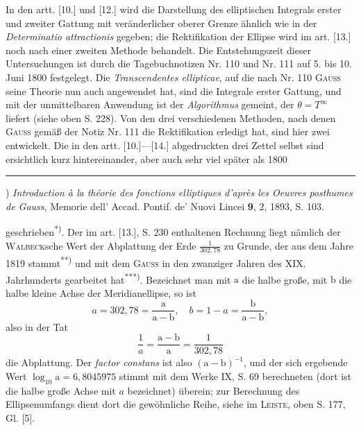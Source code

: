 \par\indent In den artt. [10.] und [12.] wird die Darstellung des elliptischen Integrals erster und zweiter Gattung mit veränderlicher oberer Grenze ähnlich wie in der \textit{Determinatio attractionis} gegeben; die Rektifikation der Ellipse wird im art. [13.] noch nach einer zweiten Methode behandelt. Die Entstehungszeit dieser Untersuchungen ist durch die Tagebuchnotizen Nr. 110 und Nr. 111 auf 5. bis 10. Juni 1800 festgelegt. Die \textit{Transcendentes ellipticae}, auf die nach Nr. 110 \textsc{Gauss} seine Theorie nun auch  angewendet hat, sind die Integrale erster Gattung, und mit der unmittelbaren Anwendung ist der \textit{Algorithmus} gemeint, der $\theta=T^\infty$ liefert (siehe oben S. 228). Von den drei verschiedenen Methoden, nach denen \textsc{Gauss} gemäß der Notiz Nr. 111 die Rektifikation erledigt hat, sind hier zwei entwickelt. Die in den artt. [10.]—[14.] abgedruckten drei Zettel selbst sind ersichtlich kurz hintereinander, aber auch sehr viel später als 1800
\par\smallskip\noindent\rule{.25\linewidth}{.4pt}\par
{\small
\par\indent *) \textit{Introduction à la théorie des fonctions elliptiques d'après les Oeuvres posthumes de Gauss}, Memorie dell’ Accad. Pontif. de’ Nuovi Lincei \textbf{9}, 2, 1893, S. 103.
\par}
\clearpage
\fancyhead{}
\noindent geschrieben\textsuperscript{*)}. Der im art. [13.], S. 230 enthaltenen Rechnung liegt nämlich der \textsc{Walbeck}sche Wert der Abplattung der Erde $\frac1{302{,}78}$ zu Grunde, der aus dem Jahre 1819 stammt\textsuperscript{**)} und mit dem \textsc{Gauss} in den zwanziger Jahren des XIX. Jahrhunderts gearbeitet hat\textsuperscript{***)}. Bezeichnet man mit $\mathrm a$ die halbe große, mit $\mathrm b$ die halbe kleine Achse der Meridianellipse, so ist
\[a=302{,}78=\frac{\mathrm a}{\mathrm a-\mathrm b},\quad b=1-a=\frac{\mathrm b}{\mathrm a-\mathrm b},\]
\noindent also in der Tat
\[\frac1a=\frac{\mathrm a-\mathrm b}{\mathrm a}=\frac1{302{,}78}\]
\noindent die Abplattung. Der \textit{factor constans} ist also $(\mathrm a-\mathrm b)^{-1}$, und der sich ergebende Wert $\log_{10}\mathrm a=6{,}8045975$ stimmt mit dem Werke IX, S. 69 berechneten (dort ist die halbe große Achse mit $a$ bezeichnet) überein; zur Berechnung des Ellipsenumfangs dient dort die gewöhnliche Reihe, siehe im \textsc{Leiste}, oben S. 177, Gl. [5].
